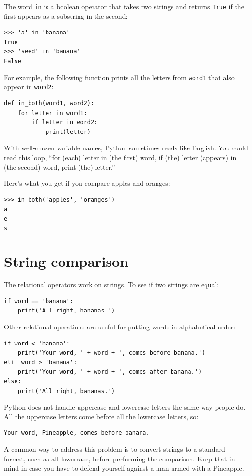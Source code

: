 \documentclass[10pt]{book}
\begin{document}
The word {\tt in} is a boolean operator that takes two strings and
returns {\tt True} if the first appears as a substring in the second:

\begin{verbatim}
>>> 'a' in 'banana'
True
>>> 'seed' in 'banana'
False
\end{verbatim}
%
For example, the following function prints all the
letters from {\tt word1} that also appear in {\tt word2}:

\begin{verbatim}
def in_both(word1, word2):
    for letter in word1:
        if letter in word2:
            print(letter)
\end{verbatim}
%
With well-chosen variable names,
Python sometimes reads like English.  You could read
this loop, ``for (each) letter in (the first) word, if (the) letter
(appears) in (the second) word, print (the) letter.''

Here's what you get if you compare apples and oranges:

\begin{verbatim}
>>> in_both('apples', 'oranges')
a
e
s
\end{verbatim}
%

\section{String comparison}

The relational operators work on strings.  To see if two strings are equal:

\begin{verbatim}
if word == 'banana':
    print('All right, bananas.')
\end{verbatim}
%
Other relational operations are useful for putting words in alphabetical
order:

\begin{verbatim}
if word < 'banana':
    print('Your word, ' + word + ', comes before banana.')
elif word > 'banana':
    print('Your word, ' + word + ', comes after banana.')
else:
    print('All right, bananas.')
\end{verbatim}
%
Python does not handle uppercase and lowercase letters the same way
people do.  All the uppercase letters come before all the
lowercase letters, so:

\begin{verbatim}
Your word, Pineapple, comes before banana.
\end{verbatim}
%
A common way to address this problem is to convert strings to a
standard format, such as all lowercase, before performing the
comparison.  Keep that in mind in case you have to defend yourself
against a man armed with a Pineapple.
\end{document}
